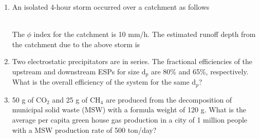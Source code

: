 \documentclass[journal,12pt,onecolumn]{IEEEtran}
\theoremstyle{remark}
\begin{document}
\begin{enumerate}
\begin{enumerate}
\end{enumerate}
\item An isolated 4-hour storm occurred over a catchment as follows\\
\begin{table}[h]
    \centering
    
\end{table}\\
The $\phi$ index for the catchment is 10 mm/h. The estimated runoff depth from the catchment due to the above storm is
\begin{enumerate}
\end{enumerate}
\item Two electrostatic precipitators  are in series. The fractional efficiencies of the upstream and downstream ESPs for size d$_p$ are 80\% and 65\%, respectively. What is the overall efficiency of the system for the same d$_p$?
\begin{enumerate}
\end{enumerate}
\item 50 g of CO$_2$ and 25 g of CH$_4$ are produced from the decomposition of municipal solid waste (MSW) with a formula weight of 120 g. What is the average per capita green house gas production in a city of 1 million people with a MSW production rate of 500 ton/day?
\begin{enumerate}
\end{enumerate}
\end{enumerate}
\end{document}
